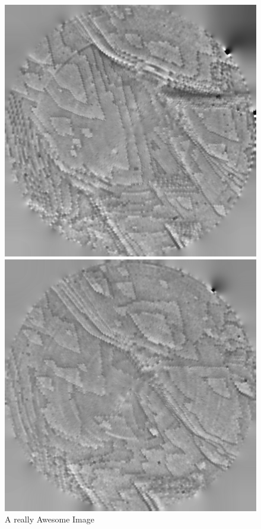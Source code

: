\begin{figure}[!ht]
\centering
{}
  \includegraphics[width=\linewidth]{images/006_X10s50l10m_MOv2_457.png}
  \caption{A really Awesome Image}\label{fig:cd4}
\endminipage\hfill
{}
  \includegraphics[width=\linewidth]{images/006_X10s50l10m_MOv2_698.png}

\end{figure}
